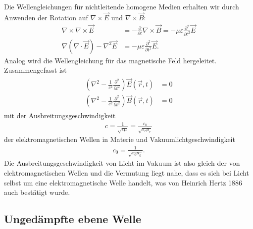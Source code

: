 Die Wellengleichungen für nichtleitende homogene Medien erhalten wir durch Anwenden der Rotation auf $\nabla\times \vec E$ und $\nabla\times\vec B$:
\begin{align*}
    \nabla\times\nabla\times\vec E            & = -\frac{\partial}{\partial t}\nabla\times \vec B =-\mu\varepsilon \frac{\partial^2}{\partial t^2}\vec E \\
    \nabla(\nabla\cdot \vec E)-\nabla^2\vec E & = -\mu\varepsilon \frac{\partial^2}{\partial t^2}\vec E.
\end{align*}
Analog wird die Wellengleichung für das magnetische Feld hergeleitet. Zusammengefasst ist
\begin{align}
    \label{eq:wellengleichungen}
    \boxed{\begin{aligned}
                   \left(\nabla^2-\frac{1}{c^2}\frac{\partial^2}{\partial t^2}\right) \vec E(\vec r,t) & =0 \\
                   \left(\nabla^2-\frac{1}{c^2}\frac{\partial^2}{\partial t^2}\right) \vec B(\vec r,t) & =0
               \end{aligned}}
\end{align}
mit der Ausbreitungsgeschwindigkeit
\begin{align*}
    c=\frac{1}{\sqrt{\varepsilon\mu}} = \frac{c_0}{\sqrt{\varepsilon_r\mu_r}}
\end{align*}
der elektromagnetischen Wellen in Materie und Vakuumlichtgeschwindigkeit
\begin{align*}
    c_0 = \frac{1}{\sqrt{\varepsilon_0\mu_0}}.
\end{align*}
Die Ausbreitungsgeschwindigkeit von Licht im Vakuum ist also gleich der von elektromagnetischen Wellen und die Vermutung liegt nahe,
dass es sich bei Licht selbst um eine elektromagnetische Welle handelt, was von Heinrich Hertz 1886 auch bestätigt wurde.



\subsection{Ungedämpfte ebene Welle}

